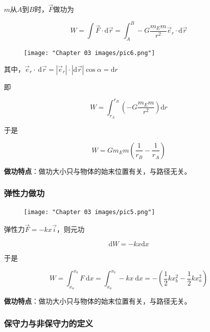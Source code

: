 \documentclass[
	12pt, %
	a4paper, %
]{myLegrandOrangeBook}
\newcommand{\rmd}{\mathrm{d}}
\begin{document}
    \(m\)从\(A\)到\(B\)时，\(\overrightarrow{F}\)做功为

    $$
    W=\int \overrightarrow{F} \cdot \rmd \overrightarrow{r}
    =\int_A^B-G \frac{m_{E} m}{r^2} \overrightarrow{e}_r \cdot \rmd \overrightarrow{r}
    $$

    \begin{figure}
        \centering
        \texttt{[image: "Chapter 03 images/pic6.png"]}
        \label{pic6}
    \end{figure}

    其中，$\overrightarrow{e}_r \cdot \mathrm{~d} \overrightarrow{r}=
    \left|\overrightarrow{e}_r\right| \cdot|\mathrm{d} \overrightarrow{r}| \cos \alpha=\mathrm{d} r$

    即

    $$
        W=\int_{r_A}^{r_B} \left(-G \frac{m_E m}{r^2}\right) \rmd r
    $$

    于是

    \begin{equation}
        W=G m_{E} m\left(\frac{1}{r_B}-\frac{1}{r_A}\right)
    \end{equation}

    \textbf{做功特点}：做功大小只与物体的始末位置有关，与路径无关。

    \subsubsection*{弹性力做功}

    \begin{figure}
        \centering
        \texttt{[image: "Chapter 03 images/pic5.png"]}
        \label{pic5}
    \end{figure}

    弹性力\(\overrightarrow{F} = -kx\overrightarrow{i}\)，则元功

    \[
        \rmd W = -kx \rmd x
    \]

    于是

    \begin{equation}
        W=\int_{x_a}^{x_b} F \mathrm{~d} x=\int_{x_a}^{x_b}-k x \mathrm{~d} x=-\left(\frac{1}{2} k x_b^2-\frac{1}{2} k x_a^2\right)
    \end{equation}

    \textbf{做功特点}：做功大小只与物体的始末位置有关，与路径无关。

    \subsubsection*{保守力与非保守力的定义}
\end{document}
